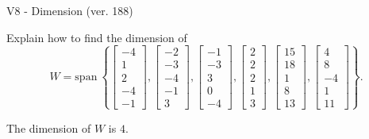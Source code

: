 \begin{exercise}
  \begin{exerciseTitle}V8 - Dimension (ver. 188)\end{exerciseTitle}
  \begin{exerciseStatement}
    Explain how to find the dimension of 
\[W=\mathrm{span}\ \left\{\left[\begin{array}{r}
-4 \\
1 \\
2 \\
-4 \\
-1
\end{array}\right] , \left[\begin{array}{r}
-2 \\
-3 \\
-4 \\
-1 \\
3
\end{array}\right] , \left[\begin{array}{r}
-1 \\
-3 \\
3 \\
0 \\
-4
\end{array}\right] , \left[\begin{array}{r}
2 \\
2 \\
2 \\
1 \\
3
\end{array}\right] , \left[\begin{array}{r}
15 \\
18 \\
1 \\
8 \\
13
\end{array}\right] , \left[\begin{array}{r}
4 \\
8 \\
-4 \\
1 \\
11
\end{array}\right]\right\}.\]



  \end{exerciseStatement}
  \begin{exerciseAnswer}
   The dimension of \(W\) is  \(4\).
  


  \end{exerciseAnswer}
\end{exercise}